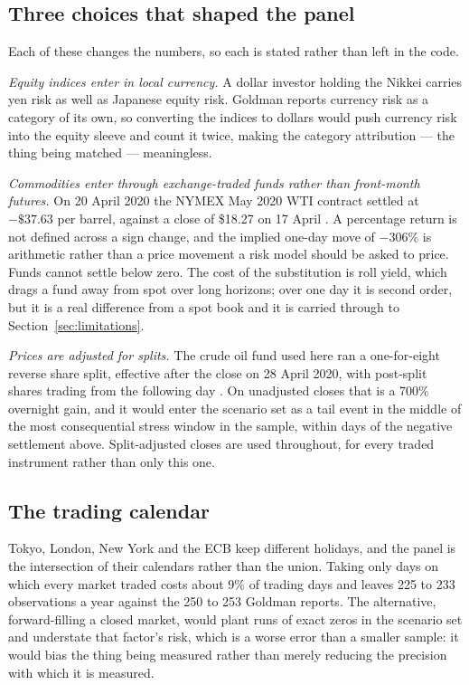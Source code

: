 \subsection{Three choices that shaped the panel}

Each of these changes the numbers, so each is stated rather than left in the
code.

\emph{Equity indices enter in local currency.} A dollar investor holding the
Nikkei carries yen risk as well as Japanese equity risk. Goldman reports
currency risk as a category of its own, so converting the indices to dollars
would push currency risk into the equity sleeve and count it twice, making the
category attribution --- the thing being matched --- meaningless.

\emph{Commodities enter through exchange-traded funds rather than front-month
futures.} On 20 April 2020 the NYMEX May 2020 WTI contract settled at
$-\$37.63$ per barrel, against a close of \$18.27 on 17 April
\citep{cftc2020wti}. A percentage return is not defined across a sign change,
and the implied one-day move of $-306\%$ is arithmetic rather than a price
movement a risk model should be asked to price. Funds cannot settle below zero.
The cost of the substitution is roll yield, which drags a fund away from spot
over long horizons; over one day it is second order, but it is a real
difference from a spot book and it is carried through to
Section~\ref{sec:limitations}.

\emph{Prices are adjusted for splits.} The crude oil fund used here ran a
one-for-eight reverse share split, effective after the close on 28 April 2020,
with post-split shares trading from the following day \citep{uso2020split}. On
unadjusted closes that is a 700\% overnight gain, and it would enter the
scenario set as a tail event in the middle of the most consequential stress
window in the sample, within days of the negative settlement above.
Split-adjusted closes are used throughout, for every traded instrument rather
than only this one.

\subsection{The trading calendar}

Tokyo, London, New York and the ECB keep different holidays, and the panel is
the intersection of their calendars rather than the union. Taking only days on
which every market traded costs about 9\% of trading days and leaves 225 to 233
observations a year against the 250 to 253 Goldman reports. The alternative,
forward-filling a closed market, would plant runs of exact zeros in the
scenario set and understate that factor's risk, which is a worse error than a
smaller sample: it would bias the thing being measured rather than merely
reducing the precision with which it is measured.

